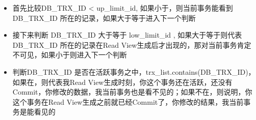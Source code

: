 \documentclass[../../../interview-questions.tex]{subfiles}
\begin{document}
\begin{itemize}
    \item {首先比较DB\_TRX\_ID < up\_limit\_id, 如果小于，则当前事务能看到DB\_TRX\_ID 所在的记录，如果大于等于进入下一个判断}
    \item {接下来判断 DB\_TRX\_ID 大于等于 low\_limit\_id , 如果大于等于则代表DB\_TRX\_ID 所在的记录在Read View生成后才出现的，那对当前事务肯定不可见，如果小于则进入下一个判断 }
    \item {判断DB\_TRX\_ID 是否在活跃事务之中，trx\_list.contains(DB\_TRX\_ID)，如果在，则代表我Read View生成时刻，你这个事务还在活跃，还没有Commit，你修改的数据，我当前事务也是看不见的；如果不在，则说明，你这个事务在Read View生成之前就已经Commit了，你修改的结果，我当前事务是能看见的}
\end{itemize}
\end{document}
